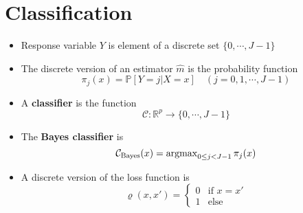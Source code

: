 \section{Classification}
\begin{theory}
 \begin{itemize}
  \item Response variable $Y$ is element of a discrete set $\{0, \cdots, J-1\}$
  \item The discrete version of an estimator $\hat{m}$ is the probability function
        \begin{equation*}
         \pi_j(x) = \mathbb{P}[Y=j|X=x]\quad(j=0,1,\cdots,J-1)
        \end{equation*}
  \item A \textbf{classifier} is the function
        \begin{equation*}
         \mathcal{C}: \mathbb{R}^p \rightarrow \{0, \cdots, J-1\}
        \end{equation*}
  \item The \textbf{Bayes classifier} is
        \begin{equation*}
         \mathcal{C}_{\text{Bayes}}(x) = \operatorname{arg max}_{0\leq j<J-1} \pi_j(x)
        \end{equation*}
  \item A discrete version of the loss function is
        \begin{equation*}
         \varrho(x, x') = \begin{cases}
                           0 & \text{if }x = x'\\
                           1 & \text{else}
                          \end{cases}
        \end{equation*}
  \end{itemize}
\end{theory}
